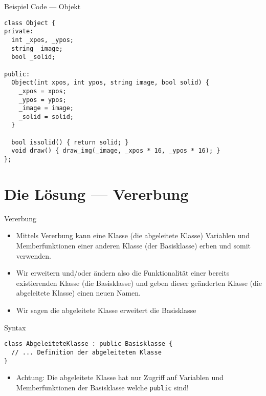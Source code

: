 \documentclass[presentation]{beamer}
\begin{document}
\begin{frame}[label={sec:org124a108},fragile]{Beispiel Code --- Objekt}
 \begin{verbatim}
class Object {
private:
  int _xpos, _ypos;
  string _image;
  bool _solid;

public:
  Object(int xpos, int ypos, string image, bool solid) {
    _xpos = xpos;
    _ypos = ypos;
    _image = image;
    _solid = solid;
  }

  bool issolid() { return solid; }
  void draw() { draw_img(_image, _xpos * 16, _ypos * 16); }
};
\end{verbatim}
\end{frame}
\section{Die Lösung --- Vererbung}
\label{sec:orgc247db7}
\begin{frame}[label={sec:org4fb10a2},fragile]{Vererbung}
 \begin{itemize}
\item Mittels Vererbung kann eine Klasse (die \alert{abgeleitete Klasse})
Variablen und Memberfunktionen einer anderen Klasse (der
\alert{Basisklasse}) erben und somit verwenden.
\item Wir erweitern und/oder ändern also die Funktionalität einer bereits
existierenden Klasse (die \alert{Basisklasse}) und geben dieser geänderten
Klasse (die \alert{abgeleitete Klasse}) einen neuen Namen.
\item Wir sagen \alert{die abgeleitete Klasse erweitert die Basisklasse}
\end{itemize}
\begin{block}{Syntax}
\begin{verbatim}
class AbgeleiteteKlasse : public Basisklasse {
  // ... Definition der abgeleiteten Klasse
}
\end{verbatim}
\end{block}
\begin{itemize}
\item \alert{Achtung}: Die abgeleitete Klasse hat nur Zugriff auf Variablen und
Memberfunktionen der Basisklasse welche {\color{solarizedYellow}\verb!public!} sind!
\end{itemize}
\end{frame}
\end{document}
